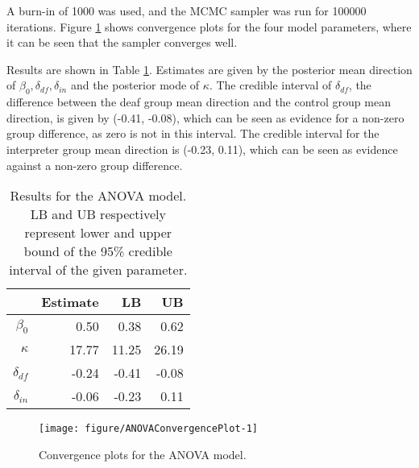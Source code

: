 \documentclass[11pt,a4paper]{article}\usepackage[]{graphicx}\usepackage[]{color}
\makeatletter
\def\maxwidth{ %
  \ifdim\Gin@nat@width>\linewidth
    \linewidth
  \else
    \Gin@nat@width
  \fi
}
\newenvironment{knitrout}{}{} %
\makeatother
\begin{document}
A burn-in of 1000 was used, and the MCMC sampler was run for 100000 iterations. Figure \ref{ANOVAConvergencePlot} shows convergence plots for the four model parameters, where it can be seen that the sampler converges well.

Results are shown in Table \ref{ANOVATable}. Estimates are given by the posterior mean direction of \( \beta_0, \delta_{df}, \delta_{in} \) and  the posterior mode of \( \kappa.\)
The credible interval of  \( \delta_{df} \), the difference between the deaf group mean direction and the control group mean direction, is given by (-0.41, -0.08), which can be seen as evidence for a non-zero group difference, as zero is not in this interval. The credible interval for the interpreter group mean direction is (-0.23, 0.11), which can be seen as evidence against a non-zero group difference.

\begin{table}[btp]
\centering
\caption{Results for the ANOVA model. LB and UB respectively represent lower and upper bound of the 95\% credible interval of the given parameter.} 
\label{ANOVATable}
\begin{tabular}{rrrr}
  \toprule
 & Estimate & LB & UB \\ 
  \midrule
$\beta_0$ & 0.50 & 0.38 & 0.62 \\ 
  $\kappa$ & 17.77 & 11.25 & 26.19 \\ 
  $\delta_{df}$ & -0.24 & -0.41 & -0.08 \\ 
  $\delta_{in}$ & -0.06 & -0.23 & 0.11 \\ 
   \bottomrule
\end{tabular}
\end{table}





\begin{figure}
\begin{knitrout}
\color{fgcolor}
\texttt{[image: figure/ANOVAConvergencePlot-1]} 

\end{knitrout}
\caption{Convergence plots for the ANOVA model.}
\label{ANOVAConvergencePlot}
\end{figure}

\end{document}
